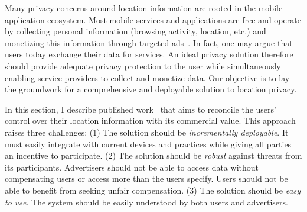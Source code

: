 


Many privacy concerns around location information are rooted in the mobile application ecosystem.
Most mobile services and applications are free and operate by collecting 
personal information (browsing activity, location, etc.) and monetizing this information 
through targeted ads~\cite{Leontiadis:2012}. 
In fact, one may argue that users today exchange their data for services.
An ideal privacy solution therefore should provide adequate privacy protection to the user while simultaneously enabling service providers to collect and monetize data. 
Our objective is to lay the groundwork for a comprehensive and deployable solution to location privacy. 

In this section, I describe published work~\cite{Riederer:2013ila} that aims to reconcile the users' control over their location information with its commercial value.
This approach raises three challenges:
(1) The solution should be \emph{incrementally deployable}. 
It must easily integrate with current devices and practices while giving all parties an incentive to participate.
(2) The solution should be \emph{robust} against threats from its participants. 
Advertisers should not be able to access data without compensating users or access more than the users specify. 
Users should not be able to benefit from seeking unfair compensation.
(3) The solution should be \emph{easy to use}. 
The system should be easily understood by both users and advertisers.

